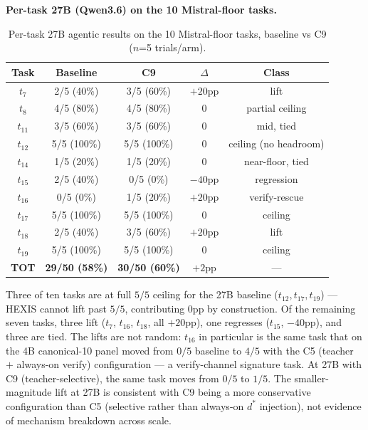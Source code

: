 \textbf{Per-task 27B (Qwen3.6) on the 10 Mistral-floor tasks.}
\begin{table}[!ht]
\centering
\small
\caption{Per-task 27B agentic results on the 10 Mistral-floor tasks, baseline vs C9 ($n$=5 trials/arm).}
\label{tab:scale_27b_pertask}
\begin{tabular}{ccccc}
\toprule
\textbf{Task} & \textbf{Baseline} & \textbf{C9} & \textbf{$\Delta$} & \textbf{Class} \\
\midrule
$t_7$    & 2/5 (40\%)  & 3/5 (60\%)  & $+20$pp  & lift \\
$t_8$    & 4/5 (80\%)  & 4/5 (80\%)  & 0        & partial ceiling \\
$t_{11}$ & 3/5 (60\%)  & 3/5 (60\%)  & 0        & mid, tied \\
$t_{12}$ & 5/5 (100\%) & 5/5 (100\%) & 0        & ceiling (no headroom) \\
$t_{14}$ & 1/5 (20\%)  & 1/5 (20\%)  & 0        & near-floor, tied \\
$t_{15}$ & 2/5 (40\%)  & 0/5 (0\%)   & $-40$pp  & regression \\
$t_{16}$ & 0/5 (0\%)   & 1/5 (20\%)  & $+20$pp  & verify-rescue \\
$t_{17}$ & 5/5 (100\%) & 5/5 (100\%) & 0        & ceiling \\
$t_{18}$ & 2/5 (40\%)  & 3/5 (60\%)  & $+20$pp  & lift \\
$t_{19}$ & 5/5 (100\%) & 5/5 (100\%) & 0        & ceiling \\
\midrule
\textbf{TOT} & \textbf{29/50 (58\%)} & \textbf{30/50 (60\%)} & $+2$pp & --- \\
\bottomrule
\end{tabular}
\end{table}

Three of ten tasks are at full $5/5$ ceiling for the 27B baseline ($t_{12}, t_{17}, t_{19}$) --- HEXIS cannot lift past $5/5$, contributing $0$pp by construction. Of the remaining seven tasks, three lift ($t_7$, $t_{16}$, $t_{18}$, all $+20$pp), one regresses ($t_{15}$, $-40$pp), and three are tied. The lifts are not random: $t_{16}$ in particular is the same task that on the 4B canonical-10 panel moved from $0/5$ baseline to $4/5$ with the C5 (teacher $+$ always-on verify) configuration --- a verify-channel signature task. At 27B with C9 (teacher-selective), the same task moves from $0/5$ to $1/5$. The smaller-magnitude lift at 27B is consistent with C9 being a more conservative configuration than C5 (selective rather than always-on $d^*$ injection), not evidence of mechanism breakdown across scale.

